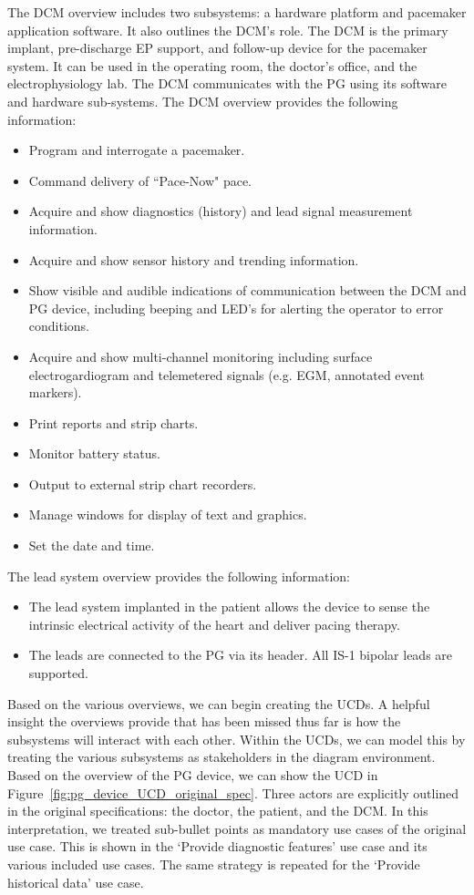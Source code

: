 The DCM overview includes two subsystems: a hardware platform and pacemaker application software. It also outlines the DCM's role. The DCM is the primary implant, pre-discharge EP support, and follow-up device for the pacemaker system. It can be used in the operating room, the doctor's office, and the electrophysiology lab. The DCM communicates with the PG using its software and hardware sub-systems. The DCM overview provides the following information:
\begin{itemize}
	\item Program and interrogate a pacemaker.
	\item Command delivery of ``Pace-Now" pace.
	\item Acquire and show diagnostics (history) and lead signal measurement information.
	\item Acquire and show sensor history and trending information.
	\item Show visible and audible indications of communication between the DCM and PG device, including beeping and LED's for alerting the operator to error conditions.
	\item Acquire and show multi-channel monitoring including surface electrogardiogram and telemetered signals (e.g. EGM, annotated event markers).
	\item Print reports and strip charts.
	\item Monitor battery status.
	\item Output to external strip chart recorders.
	\item Manage windows for display of text and graphics.
	\item Set the date and time.
\end{itemize}

The lead system overview provides the following information:
\begin{itemize}
	\item The lead system implanted in the patient allows the device to sense the intrinsic electrical activity of the heart and deliver pacing therapy.
	\item The leads are connected to the PG via its header. All IS-1 bipolar leads are supported.
\end{itemize}

Based on the various overviews, we can begin creating the UCDs. A helpful insight the overviews provide that has been missed thus far is how the subsystems will interact with each other. Within the UCDs, we can model this by treating the various subsystems as stakeholders in the diagram environment. Based on the overview of the PG device, we can show the UCD in Figure~\ref{fig:pg_device_UCD_original_spec}. Three actors are explicitly outlined in the original specifications: the doctor, the patient, and the DCM. In this interpretation, we treated sub-bullet points as mandatory use cases of the original use case. This is shown in the `Provide diagnostic features' use case and its various included use cases. The same strategy is repeated for the `Provide historical data' use case.

